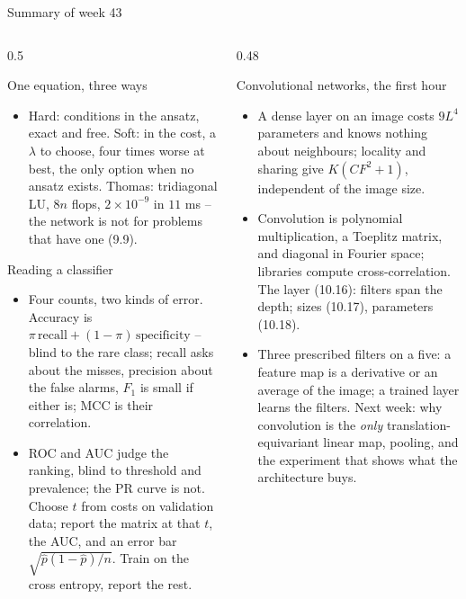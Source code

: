 \documentclass[10pt,aspectratio=169]{beamer}
\begin{document}
\begin{frame}{Summary of week 43}
\small
\begin{columns}[T]
\begin{column}{0.5\textwidth}
\begin{block}{One equation, three ways}
\footnotesize
\begin{itemize}
  \item Hard: conditions in the ansatz, exact and free.  Soft: in the
        cost, a $\lambda$ to choose, four times worse at best, the only
        option when no ansatz exists.  Thomas: tridiagonal LU, $8n$ flops,
        $2\times10^{-9}$ in $11$ ms -- the network is not for problems that
        have one (9.9).
\end{itemize}
\end{block}
\begin{block}{Reading a classifier}
\footnotesize
\begin{itemize}
  \item Four counts, two kinds of error.  Accuracy is
        $\pi\,\mathrm{recall}+(1-\pi)\,\mathrm{specificity}$ -- blind to the
        rare class; recall asks about the misses, precision about the false
        alarms, $F_1$ is small if either is; MCC is their correlation.
  \item ROC and AUC judge the ranking, blind to threshold and prevalence;
        the PR curve is not.  Choose $t$ from costs on validation data;
        report the matrix at that $t$, the AUC, and an error bar
        $\sqrt{\hat p(1-\hat p)/n}$.  Train on the cross entropy, report the
        rest.
\end{itemize}
\end{block}
\end{column}
\begin{column}{0.48\textwidth}
\begin{block}{Convolutional networks, the first hour}
\footnotesize
\begin{itemize}
  \item A dense layer on an image costs $9L^{4}$ parameters and knows
        nothing about neighbours; locality and sharing give $K(CF^{2}+1)$,
        independent of the image size.
  \item Convolution is polynomial multiplication, a Toeplitz matrix, and
        diagonal in Fourier space; libraries compute cross-correlation.
        The layer (10.16): filters span the depth; sizes (10.17), parameters
        (10.18).
  \item Three prescribed filters on a five: a feature map is a derivative
        or an average of the image; a trained layer learns the filters.
        Next week: why convolution is the \emph{only} translation-equivariant
        linear map, pooling, and the experiment that shows what the
        architecture buys.
\end{itemize}
\end{block}
\end{column}
\end{columns}
\end{frame}
\end{document}
